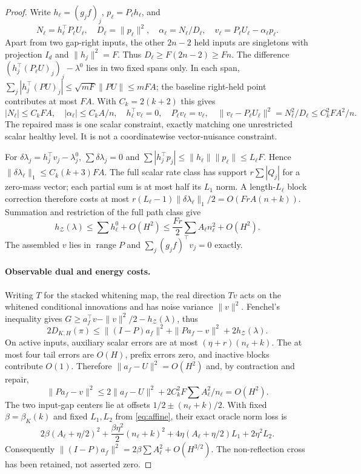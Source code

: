\documentclass[11pt]{article}
\begin{document}
\begin{proof}
Write $h_\ell=(g_jf)_j$, $p_\ell=P_\ell h_\ell$, and
\[
N_\ell=h_\ell^\top P_\ell U_\ell,\quad
D_\ell=\|p_\ell\|^2,\quad \alpha_\ell=N_\ell/D_\ell,\quad
v_\ell=P_\ell U_\ell-\alpha_\ell p_\ell .
\]
Apart from two gap-right inputs, the other $2n-2$ held inputs are singletons
with projection $I_d$ and $\|h_j\|^2=F$.
Thus $D_\ell\ge F(2n-2)\ge Fn$.
The difference $(h_j^\top(P_\ell U)_j)_j-\lambda^0$ lies in two fixed
spans only. In each span,
$\sum_j|h_j^\top(PU)_j|\le\sqrt{mF}\|PU\|\le mFA$;
the baseline right-held point contributes at most $FA$.
With $C_k=2(k+2)$ this gives
\[
|N_\ell|\le C_kFA,\quad |\alpha_\ell|\le C_kA/n,\quad
h_\ell^\top v_\ell=0,\quad P_\ell v_\ell=v_\ell,\quad
\|v_\ell-P_\ell U_\ell\|^2=N_\ell^2/D_\ell\le C_k^2FA^2/n .
\]
The repaired mass is one scalar constraint, exactly matching one unrestricted
scalar healthy level. It is not a coordinatewise vector-nuisance constraint.

For $\delta\lambda_j=h_j^\top v_j-\lambda_j^0$,
$\sum\delta\lambda_j=0$ and
$\sum|h_j^\top p_j|\le\|h_\ell\|\|p_\ell\|\le L_\ell F$.
Hence $\|\delta\lambda_\ell\|_1\le C_k(k+3)FA$.
The full scalar rate class has support $r\sum|Q_j|$ for a zero-mass vector;
each partial sum is at most half its $L_1$ norm.
A length-$L_\ell$ block correction therefore costs
at most $r(L_\ell-1)\|\delta\lambda_\ell\|_1/2=O(FrA(n+k))$.
Summation and restriction of the full path class give
\begin{equation}\label{eq:support}
h_{\mathcal Z}(\lambda)\le\sum h_\ell^0+O(H^2)
\le\frac{Fr}{2}\sum A_\ell n_\ell^2+O(H^2).
\end{equation}
The assembled $v$ lies in $\operatorname{range}P$ and
$\sum_j(g_jf)^\top v_j=0$ exactly.

\paragraph{Observable dual and energy costs.}
Writing $T$ for the stacked whitening map, the real direction $Tv$
acts on the whitened conditional innovations and has noise variance
$\|v\|^2$. Fenchel's inequality gives
$G\ge a_f^\top v-\|v\|^2/2-h_{\mathcal Z}(\lambda)$, thus
\begin{equation}\label{eq:dual}
2D_{K,H}(\pi)\le
\|(I-P)a_f\|^2+\|Pa_f-v\|^2+2h_{\mathcal Z}(\lambda).
\end{equation}
On active inputs, auxiliary scalar errors are at most $(\eta+r)(n_\ell+k)$.
The at most four tail errors are $O(H)$, prefix errors zero, and inactive
blocks contribute $O(1)$.
Therefore $\|a_f-U\|^2=O(H^2)$ and, by contraction and repair,
\[
\|Pa_f-v\|^2\le2\|a_f-U\|^2+2C_k^2F\sum A_\ell^2/n_\ell=O(H^2).
\]
The two input-gap centers lie at offsets $1/2\pm(n_\ell+k)/2$.
With fixed $\beta=\beta_K(k)$ and fixed $L_1,L_2$ from \eqref{eq:affine},
their exact oracle norm loss is
\[
2\beta(A_\ell+\eta/2)^2+\frac{\beta\eta^2}{2}(n_\ell+k)^2
+4\eta(A_\ell+\eta/2)L_1+2\eta^2L_2 .
\]
Consequently $\|(I-P)a_f\|^2=2\beta\sum A_\ell^2+O(H^{3/2})$.
The non-reflection cross has been retained, not asserted zero.


\end{proof}
\end{document}
